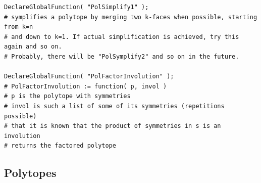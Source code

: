 \documentclass{article}
\begin{document}
\begin{verbatim}
DeclareGlobalFunction( "PolSimplify1" );
# symplifies a polytope by merging two k-faces when possible, starting from k=n
# and down to k=1. If actual simplification is achieved, try this again and so on.
# Probably, there will be "PolSymplify2" and so on in the future.

DeclareGlobalFunction( "PolFactorInvolution" );
# PolFactorInvolution := function( p, invol )
# p is the polytope with symmetries
# invol is such a list of some of its symmetries (repetitions possible)
# that it is known that the product of symmetries in s is an involution
# returns the factored polytope
\end{verbatim}


\subsection{Polytopes}
\end{document}
